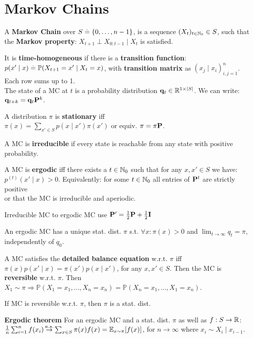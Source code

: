 \section{Markov Chains}
\begin{framed}
    A \textbf{Markov Chain} over $S \overset{.}{=} \{0, \dots, n-1\}$, is a sequence $(X_t)_{t \in \mathbb{N}_0} \in S$, such that the \textbf{Markov property}: $X_{t+1} \perp X_{0:t-1} \mid X_t$ is satisfied. 
\end{framed}
It is \textbf{time-homogeneous} if there is a \textbf{transition function}: $p(x' \mid x) \defeq \Pr{X_{t+1} = x' \mid X_t = x}$, with \textbf{transition matrix} as $\left(x_j \mid x_i \right)_{i, j = 1}^n$. Each row sums up to 1. \\
The state of a MC at $t$ is a probability distribution $\mathbf{q}_t \in \mathbb{R}^{1 \times \left| S \right|}$. We can write: $\mathbf{q}_{t+k} = \mathbf{q}_t \mathbf{P}^k$.
\begin{framed}
    A distribution $\pi$ is \textbf{stationary} iff\\ $\pi(x) = \sum_{x' \in S} p(x \mid x') \pi(x')$ or equiv. $\mathbf{\pi} = \mathbf{\pi} \mathbf{P}$.
\end{framed}
A MC is \textbf{irreducible} if every state is reachable from any state with positive probability.
\begin{framed}
    A MC is \textbf{ergodic} iff there exists a $t \in \mathbb{N}_0$ such that for any $x, x' \in S$ we have: $p^{(t)}(x' \mid x) > 0$. Equivalently:
    for some $t \in \mathbb{N}_0$ all entries of $\mathbf{P}^t$ are strictly positive \\
    or that the MC is irreducible and aperiodic.
\end{framed}
Irreducible MC to ergodic MC use $\mathbf{P}' = \frac{1}{2}\mathbf{P} + \frac{1}{2}\mathbf{I}$
\begin{framed}
    An ergodic MC has a unique stat. dist. $\pi$ s.t. \(\forall x: \pi(x)>0\) and $\lim_{t\to\infty} q_t = \pi$, independently of $q_0$.
\end{framed}
\begin{framed}
    A MC satisfies the \textbf{detailed balance equation} w.r.t. $\pi$ iff $\pi(x) p(x' \mid x) = \pi(x') p(x \mid x')$, for any $x, x' \in S$. Then the MC is \textbf{reversible} w.r.t. $\pi$.
    Then \(X_1\sim \pi \Rightarrow \mathbb{P}(X_1=x_1,\ldots,X_n=x_n)=\mathbb{P}(X_n=x_1,\ldots,X_1=x_n)\).
\end{framed}
If MC is reversible w.r.t. $\pi$, then $\pi$ is a stat. dist.
\begin{framed}
    \textbf{Ergodic theorem} For an ergodic MC and a stat. dist. $\pi$ as well as $f : S \to \mathbb{R}$:
    $\frac{1}{n} \sum_{i=1}^n f(x_i) \almostsurely \sum_{x \in S} \pi(x) f(x) = \E[x \sim \pi]{f(x)}$, for $n\to\infty$ where $x_i \sim X_i \mid x_{i-1}$.
\end{framed}
